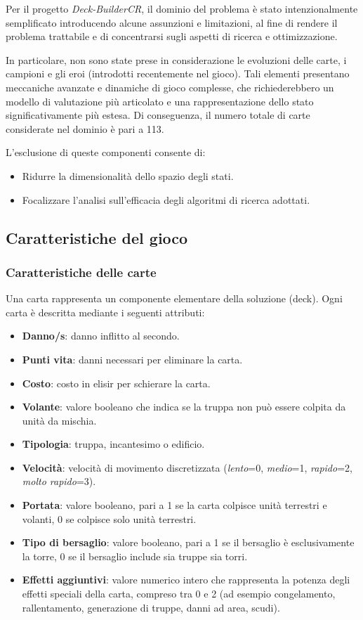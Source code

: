 \documentclass{article}
\begin{document}
Per il progetto \textit{Deck-BuilderCR}, il dominio del problema è stato intenzionalmente semplificato introducendo alcune assunzioni e limitazioni, al fine di rendere il problema trattabile e di concentrarsi sugli aspetti di ricerca e ottimizzazione.

In particolare, non sono state prese in considerazione le evoluzioni delle carte, i campioni e gli eroi (introdotti recentemente nel gioco). 
Tali elementi presentano meccaniche avanzate e dinamiche di gioco complesse, che richiederebbero un modello di valutazione più articolato e una rappresentazione dello stato significativamente più estesa. 
Di conseguenza, il numero totale di carte considerate nel dominio è pari a 113.

L’esclusione di queste componenti consente di:
\begin{itemize}
    \item Ridurre la dimensionalità dello spazio degli stati.
    \item Focalizzare l’analisi sull’efficacia degli algoritmi di ricerca adottati.
\end{itemize}

\subsection{Caratteristiche del gioco}

\subsubsection{Caratteristiche delle carte}

Una carta rappresenta un componente elementare della soluzione (deck). 
Ogni carta è descritta mediante i seguenti attributi:

\begin{itemize}
    \item \textbf{Danno/s}: danno inflitto al secondo.
    \item \textbf{Punti vita}: danni necessari per eliminare la carta.
    \item \textbf{Costo}: costo in elisir per schierare la carta.
    \item \textbf{Volante}: valore booleano che indica se la truppa non può essere colpita da unità da mischia.
    \item \textbf{Tipologia}: truppa, incantesimo o edificio.
    \item \textbf{Velocità}: velocità di movimento discretizzata (\textit{lento}=0, \textit{medio}=1, \textit{rapido}=2, \textit{molto rapido}=3).
    \item \textbf{Portata}: valore booleano, pari a 1 se la carta colpisce unità terrestri e volanti, 0 se colpisce solo unità terrestri.
    \item \textbf{Tipo di bersaglio}: valore booleano, pari a 1 se il bersaglio è esclusivamente la torre, 0 se il bersaglio include sia truppe sia torri.
    \item \textbf{Effetti aggiuntivi}: valore numerico intero che rappresenta la potenza degli effetti speciali della carta, compreso tra 0 e 2 (ad esempio congelamento, rallentamento, generazione di truppe, danni ad area, scudi).
\end{itemize}
\end{document}
